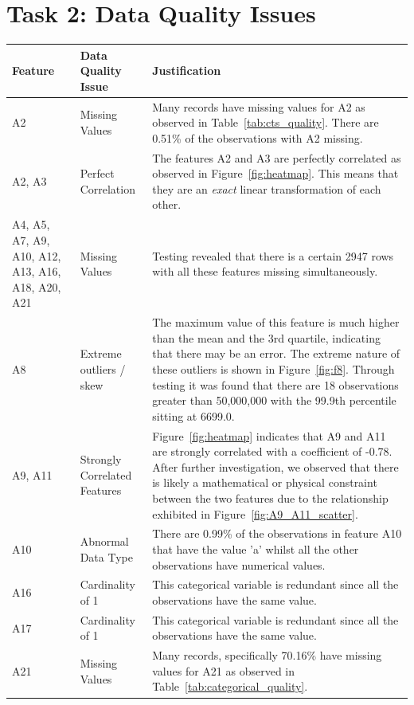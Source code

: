 \documentclass[11pt]{article}
\begin{document}
\section*{Task 2: Data Quality Issues}
\begin{table}[H]
	\centering
	\label{tab:feature_quality_issues}
	\begin{tabular}{|p{1.7cm}|l|p{8cm}|}
		\hline
		\textbf{Feature} & \textbf{Data Quality Issue} & \textbf{Justification} \\
		\hline
		A2 & Missing Values & Many records have missing values for A2 as observed in Table~\ref{tab:cts_quality}. There are 0.51\% of the observations with A2 missing. \\
		\hline
		A2, A3 & Perfect Correlation & The features A2 and A3 are perfectly correlated as observed in Figure~\ref{fig:heatmap}. This means that they are an \textit{exact} linear transformation of each other.\\
		\hline
		A4, A5, A7, A9, A10, A12, A13, A16, A18, A20, A21 & Missing Values & Testing revealed that there is a certain 2947 rows with all these features missing simultaneously. \\
		\hline
		A8 & Extreme outliers / skew & The maximum value of this feature is much higher than the mean and the 3rd quartile, indicating that there may be an error. The extreme nature of these outliers is shown in Figure~\ref{fig:f8}. Through testing it was found that there are 18 observations greater than 50,000,000 with the 99.9th percentile sitting at 6699.0.\\
		\hline
		A9, A11 & Strongly Correlated Features & Figure~\ref{fig:heatmap} indicates that A9 and A11 are strongly correlated with a coefficient of  -0.78. After further investigation, we observed that there is likely a mathematical or physical constraint between the two features due to the relationship exhibited in Figure~\ref{fig:A9_A11_scatter}.\\
		\hline
		A10 & Abnormal Data Type & There are 0.99\% of the observations in feature A10 that have the value 'a' whilst all the other observations have numerical values. \\
		\hline
		A16 & Cardinality of 1 & This categorical variable is redundant since all the observations have the same value.  \\
		\hline
		A17 & Cardinality of 1 & This categorical variable is redundant since all the observations have the same value. \\
		\hline
		A21 & Missing Values & Many records, specifically 70.16\% have missing values for A21 as observed in Table~\ref{tab:categorical_quality}. \\

\end{tabular}
\end{table}
\end{document}
